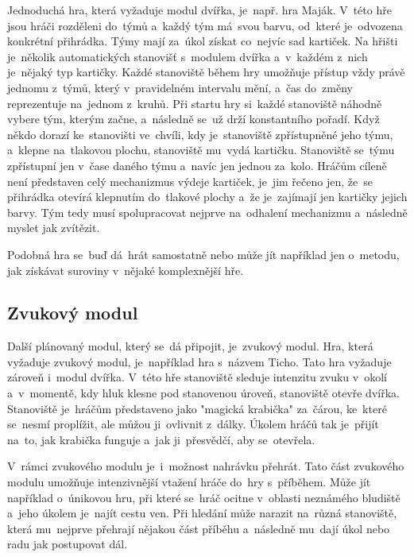 Jednoduchá hra, která vyžaduje modul dvířka, je~např. hra Maják. %
V~této hře jsou hráči rozděleni do~týmů a~každý tým má~svou barvu, od~které je~odvozena konkrétní přihrádka. 
Týmy mají za~úkol získat co~nejvíc sad kartiček.
Na hřišti je~několik automatických stanovišť s~modulem dvířka a~v~každém z~nich je~nějaký typ kartičky.
Každé stanoviště během hry umožňuje přístup vždy právě jednomu z~týmů, který v~pravidelném intervalu mění, a~čas do~změny reprezentuje na~jednom z~kruhů.
Při startu hry si~každé stanoviště náhodně vybere tým, kterým začne, a~následně se~už drží konstantního pořadí.
Když někdo dorazí ke~stanovišti ve~chvíli, kdy je~stanoviště zpřístupněné jeho týmu, a~klepne na~tlakovou plochu, stanoviště mu~vydá kartičku.
Stanoviště se~týmu zpřístupní jen v~čase daného týmu a~navíc jen jednou za~kolo.
Hráčům cíleně není představen celý mechanizmus výdeje kartiček, je~jim řečeno jen, že~se přihrádka otevírá klepnutím do~tlakové plochy a~že je~zajímají jen kartičky jejich barvy. 
Tým tedy musí spolupracovat nejprve na~odhalení mechanizmu a~následně myslet jak zvítězit.

Podobná hra se~buď dá~hrát samostatně nebo může jít například jen o~metodu, jak získávat suroviny v~nějaké komplexnější hře.

\subsection{Zvukový modul}
Další plánovaný modul, který se~dá připojit, je~zvukový modul.
Hra, která vyžaduje zvukový modul, je~například hra s~názvem Ticho.
Tato hra vyžaduje zároveň i~modul dvířka.
V~této hře stanoviště sleduje intenzitu zvuku v~okolí a~v~momentě, kdy hluk klesne pod stanovenou úroveň, stanoviště otevře dvířka. 
Stanoviště je~hráčům představeno jako "magická krabička"\- za~čárou, ke~které se~nesmí proplížit, ale můžou ji~ovlivnit z~dálky.
Úkolem hráčů tak je~přijít na~to, jak krabička funguje a~jak ji~přesvědčí, aby se~otevřela.

V~rámci zvukového modulu je~i~možnost nahrávku přehrát.
Tato část zvukového modulu umožňuje intenzivnější vtažení hráče do~hry s~příběhem.
Může jít například o~únikovou hru, při které se~hráč ocitne v~oblasti neznámého bludiště a~jeho úkolem je~najít cestu ven.
Při hledání může narazit na~různá stanoviště, která mu~nejprve přehrají nějakou část příběhu a~následně mu~dají úkol nebo radu jak postupovat dál.

